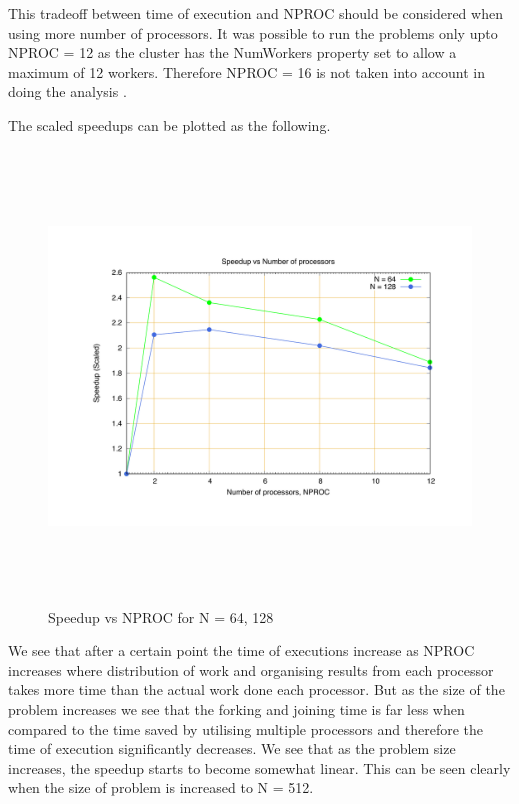 \documentclass[fleqn,letterpaper,12pt]{report}
\begin{document}
This tradeoff between time of execution and NPROC should be considered when using more number of processors. It was possible to run the problems only upto NPROC = 12 as the cluster has the NumWorkers property set to allow a maximum of 12 workers. Therefore NPROC = 16 is not taken into account in doing the analysis \cite{PK}.

The scaled speedups can be plotted as the following. 
\begin{figure}[htbp]
	\centering
	\includegraphics[height=120mm,width=160mm]{64128smat.pdf}
	\caption{Speedup vs NPROC for N = 64, 128\label{overflow}}
\end{figure}

We see that after a certain point the time of executions increase as NPROC increases where distribution of work and organising results from each processor takes more time than the actual work done each processor. But as the size of the problem increases we see that the forking and joining time is far less when compared to the time saved by utilising multiple processors and therefore the time of execution significantly decreases.
\newpage
We see that as the problem size increases, the speedup starts to become somewhat linear. This can be seen clearly when the size of problem is increased to N = 512.
\end{document}
